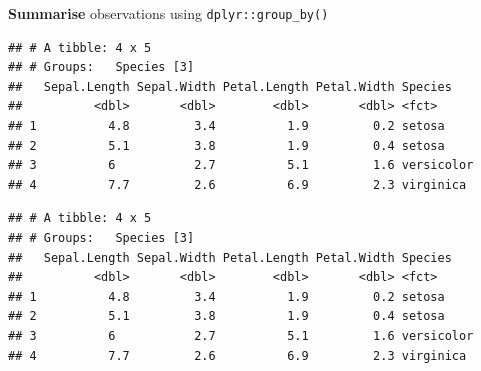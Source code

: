 \documentclass[14pt,ignorenonframetext,]{bredelebeamer}
\newenvironment{Shaded}{\begin{snugshade}}{\end{snugshade}}
\newcommand{\KeywordTok}[1]{\textcolor[rgb]{0.94,0.87,0.69}{#1}}
\newcommand{\DecValTok}[1]{\textcolor[rgb]{0.86,0.86,0.80}{#1}}
\newcommand{\StringTok}[1]{\textcolor[rgb]{0.80,0.58,0.58}{#1}}
\newcommand{\OperatorTok}[1]{\textcolor[rgb]{0.94,0.94,0.82}{#1}}
\newcommand{\NormalTok}[1]{\textcolor[rgb]{0.80,0.80,0.80}{#1}}
\begin{document}
\begin{frame}[fragile]{\textbf{Summarise} observations using
\texttt{dplyr::group\_by()}}

\begin{Shaded}
\end{Shaded}

\begin{verbatim}
## # A tibble: 4 x 5
## # Groups:   Species [3]
##   Sepal.Length Sepal.Width Petal.Length Petal.Width Species   
##          <dbl>       <dbl>        <dbl>       <dbl> <fct>     
## 1          4.8         3.4          1.9         0.2 setosa    
## 2          5.1         3.8          1.9         0.4 setosa    
## 3          6           2.7          5.1         1.6 versicolor
## 4          7.7         2.6          6.9         2.3 virginica
\end{verbatim}

\begin{Shaded}
\end{Shaded}

\begin{verbatim}
## # A tibble: 4 x 5
## # Groups:   Species [3]
##   Sepal.Length Sepal.Width Petal.Length Petal.Width Species   
##          <dbl>       <dbl>        <dbl>       <dbl> <fct>     
## 1          4.8         3.4          1.9         0.2 setosa    
## 2          5.1         3.8          1.9         0.4 setosa    
## 3          6           2.7          5.1         1.6 versicolor
## 4          7.7         2.6          6.9         2.3 virginica
\end{verbatim}

\end{frame}
\end{document}
